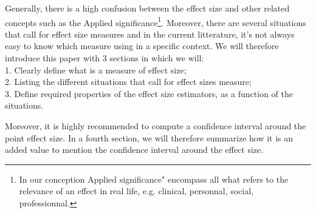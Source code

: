 \documentclass[
  man,floatsintext]{apa6}
\begin{document}
Generally, there is a high confusion between the effect size and other related concepts such as the Applied significance\footnote{In our conception  Applied significance" encompass all what refers to the relevance of an effect in real life, e.g. clinical, personnal, social, professionnal.}. Moreover, there are several situations that call for effect size measures and in the current litterature, it's not always easy to know which measure using in a specific context. We will therefore introduce this paper with 3 sections in which we will:\\
1. Clearly define what is a measure of effect size;\\
2. Listing the different situations that call for effect sizes measure;\\
3. Define required properties of the effect size estimators, as a function of the situations.

Moreover, it is highly recommended to compute a confidence interval around the point effect size. In a fourth section, we will therefore summarize how it is an added value to mention the confidence interval around the effect size.
\end{document}
